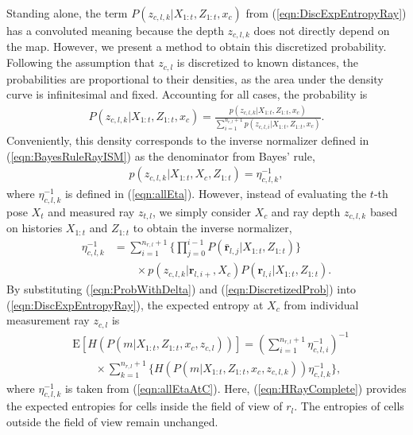 \documentclass[letterpaper, 10pt, conference]{ieeeconf}
\newcommand{\refeqn}[1]{(\ref{eqn:#1})}
\begin{document}
Standing alone, the term $P(z_{c,l,k}|X_{1:t},Z_{1:t},x_c)$ from \refeqn{DiscExpEntropyRay} has a convoluted meaning because the depth $z_{c,l,k}$ does not directly depend on the map. However, we present a method to obtain this discretized probability. %
Following the assumption that $z_{c,l}$ is discretized to known distances, the probabilities are proportional to their densities, as the area under the density curve is infinitesimal and fixed. Accounting for all cases, the probability is
\begin{align}
\label{eqn:ProbWithDelta}
P(z_{c,l,k}|X_{1:t},Z_{1:t},x_c)=\frac{p(z_{c,l,k}|X_{1:t},Z_{1:t},x_c)}{\sum_{i=1}^{n_{r,l}+1}p(z_{c,l,i}|X_{1:t},Z_{1:t},x_c)}.
\end{align}
Conveniently, this density corresponds to the inverse normalizer defined in \refeqn{BayesRuleRayISM} as the denominator from Bayes' rule,
\begin{align}
\label{eqn:DiscretizedProb}
p(z_{c,l,k}|X_{1:t},X_c,Z_{1:t})=\eta_{c,l,k}^{-1},
\end{align}
where $\eta_{c,l,k}^{-1}$ is defined in \refeqn{allEta}. However, instead of evaluating the $t$-th pose $X_t$ and measured ray $z_{t,l}$, we simply consider $X_c$ and ray depth $z_{c,l,k}$ based on histories $X_{1:t}$ and $Z_{1:t}$ to obtain the inverse normalizer,
\begin{align}
\label{eqn:allEtaAtC}
\eta_{c,l,k}^{-1}
&=
\sum_{i=1}^{n_{r,l}+1}\bigg\{\prod_{j=0}^{i-1}P(\bar{\mathbf{r}}_{l,j}|X_{1:t},Z_{1:t})\bigg\}\nonumber\\&\qquad\times p(z_{c,l,k}|\mathbf{r}_{l,i+},X_c)P(\mathbf{r}_{l,i}|X_{1:t},Z_{1:t}).
\end{align}
By substituting \refeqn{ProbWithDelta} and \refeqn{DiscretizedProb} into \refeqn{DiscExpEntropyRay}, the expected entropy at $X_c$ from individual measurement ray $z_{c,l}$ is
\begin{align}
\label{eqn:HRayComplete}
&\text{E}[H(P(m|X_{1:t},Z_{1:t},x_c,z_{c,l}))]=\left(\sum_{i=1}^{n_{r,l}+1}\eta_{c,l,i}^{-1}\right)^{-1}\nonumber\\&\quad\quad\times\sum_{k=1}^{n_{r,l}+1}\bigg\{H(P(m|X_{1:t},Z_{1:t},x_c,z_{c,l,k}))\eta_{c,l,k}^{-1}\bigg\},
\end{align}
where $\eta_{c,l,k}^{-1}$ is taken from \refeqn{allEtaAtC}.
Here, \refeqn{HRayComplete} provides the expected entropies for cells inside the field of view of $r_l$. %
The entropies of cells outside the field of view remain unchanged.
\end{document}

